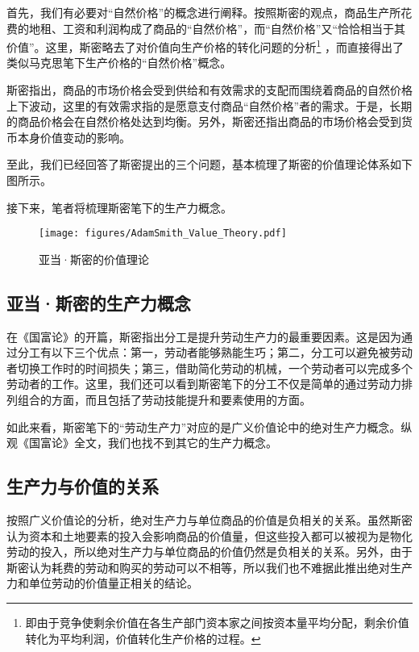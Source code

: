 首先，我们有必要对“自然价格”的概念进行阐释。按照斯密的观点，商品生产所花费的地租、工资和利润构成了商品的“自然价格”，而“自然价格”又“恰恰相当于其价值”\cite[49]{YaDang*SiMiGuoFuLun2015}。这里，斯密略去了对价值向生产价格的转化问题的分析\footnote{即由于竞争使剩余价值在各生产部门资本家之间按资本量平均分配，剩余价值转化为平均利润，价值转化生产价格的过程\cite{XieFuShengXiFangXueZheGuanYuMaKeSiJieZhiZhuanXingLiLunYanJiuShuPing2000}。}
，而直接得出了类似马克思笔下生产价格的“自然价格”概念。

斯密指出，商品的市场价格会受到供给和有效需求的支配而围绕着商品的自然价格上下波动，这里的有效需求指的是愿意支付商品“自然价格”者的需求\cite[50]{YaDang*SiMiGuoFuLun2015}。于是，长期的商品价格会在自然价格处达到均衡\cite[50]{YaDang*SiMiGuoFuLun2015}。另外，斯密还指出商品的市场价格会受到货币本身价值变动的影响\cite[28-31]{YaDang*SiMiGuoFuLun2015}。

至此，我们已经回答了斯密提出的三个问题，基本梳理了斯密的价值理论体系如下图所示。

接下来，笔者将梳理斯密笔下的生产力概念。

\begin{figure}
    \centering
    \caption{亚当·斯密的价值理论}
    \label{figures:AdamSmith_Value_Theory}
    \texttt{[image: figures/AdamSmith\_Value\_Theory.pdf]}
\end{figure}

\subsection{亚当·斯密的生产力概念}

在《国富论》的开篇，斯密指出分工是提升劳动生产力的最重要因素\cite[3]{YaDang*SiMiGuoFuLun2015}。这是因为通过分工有以下三个优点：第一，劳动者能够熟能生巧；第二，分工可以避免被劳动者切换工作时的时间损失；第三，借助简化劳动的机械，一个劳动者可以完成多个劳动者的工作。\cite[6]{YaDang*SiMiGuoFuLun2015}这里，我们还可以看到斯密笔下的分工不仅是简单的通过劳动力排列组合的方面，而且包括了劳动技能提升和要素使用的方面。

如此来看，斯密笔下的“劳动生产力”对应的是广义价值论中的绝对生产力概念。纵观《国富论》全文，我们也找不到其它的生产力概念。

\subsection{生产力与价值的关系}

按照广义价值论的分析，绝对生产力与单位商品的价值是负相关的关系。虽然斯密认为资本和土地要素的投入会影响商品的价值量，但这些投入都可以被视为是物化劳动的投入，所以绝对生产力与单位商品的价值仍然是负相关的关系。另外，由于斯密认为耗费的劳动和购买的劳动可以不相等，所以我们也不难据此推出绝对生产力和单位劳动的价值量正相关的结论。


